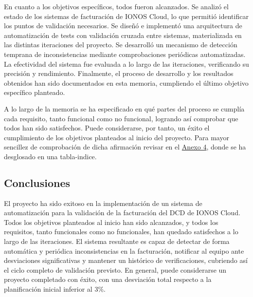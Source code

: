         En cuanto a los objetivos específicos, todos fueron alcanzados. Se analizó el estado de los sistemas de facturación de IONOS Cloud, lo que permitió identificar los puntos de validación necesarios. Se diseñó e implementó una arquitectura de automatización de tests con validación cruzada entre sistemas, materializada en las distintas iteraciones del proyecto. Se desarrolló un mecanismo de detección temprana de inconsistencias mediante comprobaciones periódicas automatizadas. La efectividad del sistema fue evaluada a lo largo de las iteraciones, verificando su precisión y rendimiento. Finalmente, el proceso de desarrollo y los resultados obtenidos han sido documentados en esta memoria, cumpliendo el último objetivo específico planteado.

       A lo largo de la memoria se ha especificado en qué partes del proceso se cumplía cada requisito, tanto funcional como no funcional, logrando así comprobar que todos han sido satisfechos. Puede considerarse, por tanto, un éxito el cumplimiento de los objetivos planteados al inicio del proyecto. Para mayor sencillez de comprobación de dicha afirmación revisar en el \hyperref[anexo:tabla-objetivos]{Anexo 4}, donde se ha desglosado en una tabla-indice.

       \subsection{Conclusiones}
         El proyecto ha sido exitoso en la implementación de un sistema de automatización para la validación de la facturación del DCD de IONOS Cloud. Todos los objetivos planteados al inicio han sido alcanzados, y todos los requisitos, tanto funcionales como no funcionales, han quedado satisfechos a lo largo de las iteraciones. El sistema resultante es capaz de detectar de forma automática y periódica inconsistencias en la facturación, notificar al equipo ante desviaciones significativas y mantener un histórico de verificaciones, cubriendo así el ciclo completo de validación previsto. En general, puede considerarse un proyecto completado con éxito, con una desviación total respecto a la planificación inicial inferior al 3\%.


